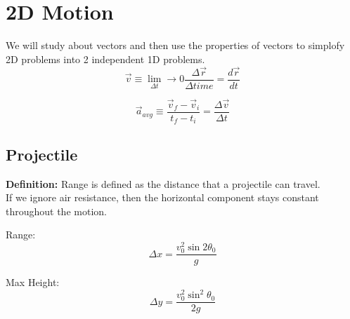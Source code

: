 \documentclass[]{article}
\date{}
\title{\docTitle}
\author{\docAuthor}
\date{\today}
\begin{document}
\maketitle
\section*{2D Motion}
We will study about vectors and then use the properties of vectors to simplofy 2D problems into 2 independent 1D problems.
\begin{equation*}
	\vec{v} \equiv \lim_{\Delta t}\to{0} \frac{\Delta\vec{r}}{\Delta{time}} = \frac{d\vec{r}}{dt}
\end{equation*}

\begin{equation*}
	\vec{a}_{avg} \equiv \frac{\vec{v}_f-\vec{v}_{i}}{t_f-t_i} = \frac{\Delta \vec{v}}{\Delta{t}}
\end{equation*}

\subsection*{Projectile}
\textbf{Definition:} Range is defined as the distance that a projectile can travel.\\
If we ignore air resistance, then the horizontal component stays constant throughout the motion.

Range:\\
\begin{equation*}
	\Delta{x}=\frac{v_0^2\sin{2}\theta_0}{g}
\end{equation*}

Max Height:\\
\begin{equation*}
	\Delta y = \frac{v_0^2\sin^2\theta_0}{2g}
\end{equation*}
\end{document}
